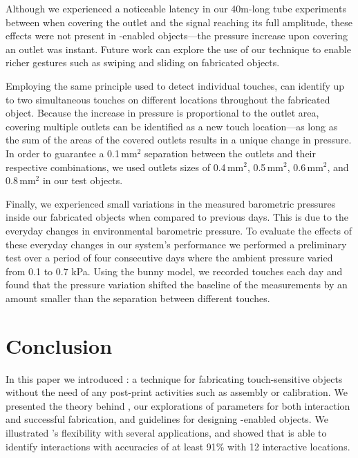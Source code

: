 		Although we experienced a noticeable latency in our 40m-long tube
		experiments between when covering the outlet and the signal reaching its
		full amplitude, these effects were not present in \at-enabled objects---the
		pressure increase upon covering an outlet was instant. Future work can
		explore the use of our technique to enable richer gestures such as swiping
		and sliding on fabricated objects.
		
		Employing the same principle used to detect individual touches, \at can
		identify up to two simultaneous touches on different locations throughout
		the fabricated object. Because the increase in pressure is proportional to
		the outlet area, covering multiple outlets can be identified as a new touch
		location---as long as the sum of the areas of the covered outlets results in
		a unique change in pressure. In order to guarantee a 0.1\,mm$^2$ separation
		between the outlets and their respective combinations, we used outlets sizes
		of 0.4\,mm$^2$, 0.5\,mm$^2$, 0.6\,mm$^2$, and 0.8\,mm$^2$ in our test
		objects.
		
		Finally, we experienced small variations in the measured barometric
		pressures inside our fabricated objects when compared to previous days. This
		is due to the everyday changes in environmental barometric pressure. To
		evaluate the effects of these everyday changes in our system's performance
		we performed a preliminary test over a period of four consecutive days where
		the ambient pressure varied from 0.1 to 0.7 kPa. Using the bunny model, we
		recorded touches each day and found that the pressure variation shifted the
		baseline of the measurements by an amount smaller than the separation
		between different touches.
	    
	\section{Conclusion}
		In this paper we introduced \at: a technique for fabricating touch-sensitive
		objects without the need of any post-print activities such as assembly or
		calibration. We presented the theory behind \at, our explorations of
		parameters for both interaction and successful fabrication, and guidelines
		for designing \at-enabled objects. We illustrated \at's flexibility with
		several applications, and showed that \at is able to identify interactions
		with accuracies of at least 91\% with 12 interactive locations.
	
